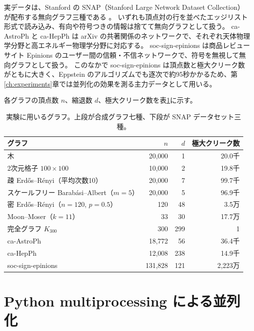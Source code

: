 実データは、Stanford の SNAP（Stanford Large Network Dataset Collection）が配布する無向グラフ三種である \cite{snap}。
いずれも頂点対の行を並べたエッジリスト形式で読み込み、有向や符号つきの情報は捨てて無向グラフとして扱う。
ca-AstroPh と ca-HepPh は arXiv の共著関係のネットワークで、それぞれ天体物理学分野と高エネルギー物理学分野に対応する。
soc-sign-epinions は商品レビューサイト Epinions のユーザー間の信頼・不信ネットワークで、符号を無視して無向グラフとして扱う。
このなかで soc-sign-epinions は頂点数と極大クリーク数がともに大きく、Eppstein のアルゴリズムでも逐次で約95秒かかるため、第\ref{ch:experiments}章では並列化の効果を測る主力データとして用いる。

各グラフの頂点数 $n$、縮退数 $d$、極大クリーク数を表\ref{tab:graphs}に示す。

\begin{table}[htbp]
  \centering
  \caption{実験に用いるグラフ。上段が合成グラフ七種、下段が SNAP データセット三種。}
  \label{tab:graphs}
  \begin{tabular}{lrrr}
    \toprule
    グラフ & $n$ & $d$ & 極大クリーク数 \\
    \midrule
    木 & 20{,}000 & 1 & 20.0千 \\
    2次元格子 $100 \times 100$ & 10{,}000 & 2 & 19.8千 \\
    疎 Erd\H{o}s--R\'enyi（平均次数10） & 20{,}000 & 7 & 99.7千 \\
    スケールフリー Barab\'asi--Albert（$m=5$） & 20{,}000 & 5 & 96.9千 \\
    密 Erd\H{o}s--R\'enyi（$n=120$, $p=0.5$） & 120 & 48 & 3.5万 \\
    Moon--Moser（$k=11$） & 33 & 30 & 17.7万 \\
    完全グラフ $K_{300}$ & 300 & 299 & 1 \\
    \midrule
    ca-AstroPh & 18{,}772 & 56 & 36.4千 \\
    ca-HepPh & 12{,}008 & 238 & 14.9千 \\
    soc-sign-epinions & 131{,}828 & 121 & 2{,}223万 \\
    \bottomrule
  \end{tabular}
\end{table}


\section{Python multiprocessing による並列化}
\label{sec:multiprocessing}

